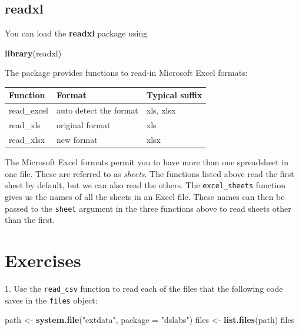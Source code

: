 \documentclass[
]{krantz}
\newenvironment{Shaded}{\begin{snugshade}}{\end{snugshade}}
\newcommand{\DataTypeTok}[1]{\textcolor[rgb]{0.27,0.27,0.27}{#1}}
\newcommand{\KeywordTok}[1]{\textcolor[rgb]{0.27,0.27,0.27}{\textbf{#1}}}
\newcommand{\NormalTok}[1]{#1}
\newcommand{\StringTok}[1]{\textcolor[rgb]{0.5,0.5,0.5}{#1}}
\begin{document}
\hypertarget{readxl}{%
\subsection{readxl}\label{readxl}}

You can load the \textbf{readxl} package using

\begin{Shaded}
\begin{Highlighting}[]
\KeywordTok{library}\NormalTok{(readxl)}
\end{Highlighting}
\end{Shaded}

The package provides functions to read-in Microsoft Excel formats:

\begin{longtable}[]{@{}lll@{}}
\toprule
Function & Format & Typical suffix\tabularnewline
\midrule
\endhead
read\_excel & auto detect the format & xls, xlsx\tabularnewline
read\_xls & original format & xls\tabularnewline
read\_xlsx & new format & xlsx\tabularnewline
\bottomrule
\end{longtable}

The Microsoft Excel formats permit you to have more than one spreadsheet in one file. These are referred to as \emph{sheets}. The functions listed above read the first sheet by default, but we can also read the others. The \texttt{excel\_sheets} function gives us the names of all the sheets in an Excel file. These names can then be passed to the \texttt{sheet} argument in the three functions above to read sheets other than the first.

\hypertarget{exercises-13}{%
\section{Exercises}\label{exercises-13}}

1. Use the \texttt{read\_csv} function to read each of the files that the following code saves in the \texttt{files} object:

\begin{Shaded}
\begin{Highlighting}[]
\NormalTok{path <-}\StringTok{ }\KeywordTok{system.file}\NormalTok{(}\StringTok{"extdata"}\NormalTok{, }\DataTypeTok{package =} \StringTok{"dslabs"}\NormalTok{)}
\NormalTok{files <-}\StringTok{ }\KeywordTok{list.files}\NormalTok{(path)}
\NormalTok{files}
\end{Highlighting}
\end{Shaded}
\end{document}
